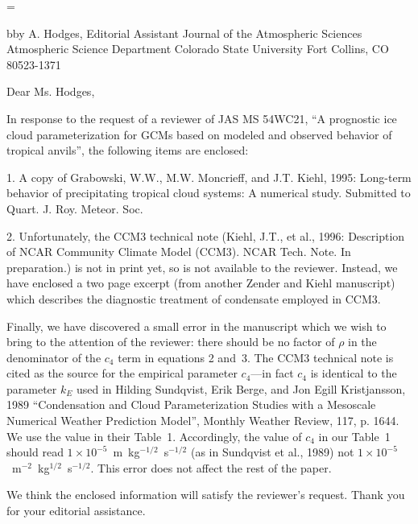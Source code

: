 

\magnification=

\addressdefine
\formalletterhead

\address
Abby A. Hodges, Editorial Assistant
Journal of the Atmospheric Sciences
Atmospheric Science Department
Colorado State University
Fort Collins, CO 80523-1371

\body
Dear Ms. Hodges,

In response to the request of a reviewer of JAS MS 54WC21, ``A
prognostic ice cloud parameterization for {GCM}s based on modeled and
observed behavior of tropical anvils'', the following items are
enclosed: 

\item{1.} A copy of Grabowski, W.W., M.W. Moncrieff, and J.T. Kiehl,
              1995: Long-term behavior of precipitating tropical 
                cloud systems:  A numerical study.  Submitted
                to Quart. J. Roy. Meteor. Soc.

\item{2.} Unfortunately, the CCM3 technical note (Kiehl, J.T., et al.,
                1996: Description of NCAR Community Climate Model
                (CCM3).  NCAR Tech. Note.  In preparation.) is not in
                print yet, so is not available to the reviewer. 
Instead, we have enclosed a two page excerpt (from another Zender and
Kiehl manuscript) which describes the diagnostic treatment of
condensate employed in CCM3.  

Finally, we have discovered a small error in the manuscript which we
wish to bring to the attention of the reviewer:  
there should be no factor of $\rho$ in the denominator of the
$c_4$ term in equations 2 and~3.
The CCM3 technical note is cited as the source for the empirical
parameter $c_4$---in fact $c_4$ is identical to the parameter $k_E$
used in Hilding Sundqvist, Erik Berge, and Jon Egill Kristjansson,
1989 ``Condensation and Cloud Parameterization Studies with a
Mesoscale Numerical Weather Prediction Model'', Monthly Weather
Review, 117, p. 1644. 
We use the value in their Table~1. 
Accordingly, the value of $c_4$ in our Table~1 should read $1 \times
10^{-5}$~m~kg$^{-1/2}$~s$^{-1/2}$ (as in Sundqvist et al., 1989) not
$1 \times 10^{-5}$~m$^{-2}$~kg$^{1/2}$~s$^{-1/2}$.  
This error does not affect the rest of the paper.

We think the enclosed information will satisfy the reviewer's request. 
Thank you for your editorial assistance.

